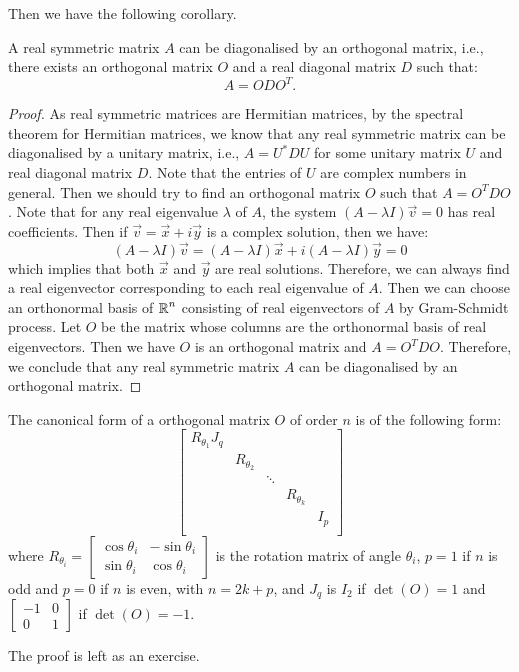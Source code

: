Then we have the following corollary.
\begin{corollary}
	A real symmetric matrix $A$ can be diagonalised by an orthogonal matrix, i.e., there exists an orthogonal matrix $O$ and a real diagonal matrix $D$ such that:
	\[
		A = O D O^T.
	\]
\end{corollary}
\begin{proof}
	As real symmetric matrices are Hermitian matrices, by the spectral theorem for Hermitian matrices, we know that any real symmetric matrix can be diagonalised by a unitary matrix, i.e., $A = U^{*} D U$ for some unitary matrix $U$ and real diagonal matrix $D$. Note that the entries of $U$ are complex numbers in general. Then we should try to find an orthogonal matrix $O$ such that $A = O^T D O$. Note that for any real eigenvalue $\lambda$ of $A$, the system $(A - \lambda I) \vec{v} = 0$ has real coefficients. Then if $\vec{v} = \vec{x} + i \vec{y}$ is a complex solution, then we have:
	\[
		(A - \lambda I) \vec{v} = (A - \lambda I) \vec{x} + i (A - \lambda I) \vec{y} = 0
	\]
	which implies that both $\vec{x}$ and $\vec{y}$ are real solutions. Therefore, we can always find a real eigenvector corresponding to each real eigenvalue of $A$. Then we can choose an orthonormal basis of $\operatorname{\mathbb{R}}^n$ consisting of real eigenvectors of $A$ by Gram-Schmidt process. Let $O$ be the matrix whose columns are the orthonormal basis of real eigenvectors. Then we have $O$ is an orthogonal matrix and $A = O^T D O$. Therefore, we conclude that any real symmetric matrix $A$ can be diagonalised by an orthogonal matrix.
\end{proof}

\begin{proposition}
	The canonical form of a orthogonal matrix $O$ of order $n$ is of the following form:
	\[
		\begin{bmatrix}
			R_{\theta_1} J_q &              &        &              &       \\
			                 & R_{\theta_2} &        &              &       \\
			                 &              & \ddots &              &       \\
			                 &              &        & R_{\theta_k} &       \\
			                 &              &        &              & I_{p} \\
		\end{bmatrix}
	\]
	where $R_{\theta_i} = \begin{bmatrix} \cos \theta_i & -\sin \theta_i \\ \sin \theta_i & \cos \theta_i \end{bmatrix}$ is the rotation matrix of angle $\theta_i$, $p = 1$ if $n$ is odd and $p = 0$ if $n$ is even, with $n = 2k + p$, and $J_q$ is $I_2$ if $\det(O) = 1$ and $\begin{bmatrix} -1 & 0 \\ 0  & 1 \end{bmatrix}$ if $\det(O) = -1$.
\end{proposition}
The proof is left as an exercise.

